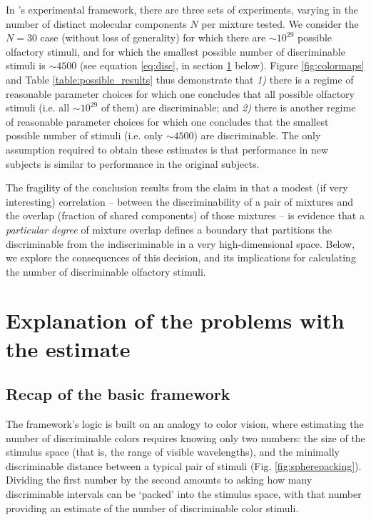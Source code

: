 \documentclass[letterpaper,twocolumn,10pt]{article}
\begin{document}
In \cite{bushdid_humans_2014}'s experimental framework, there are three sets of experiments, varying in the number of distinct molecular components $N$ per mixture tested.  
We consider the $N=30$ case (without loss of generality) for which there are $\sim 10^{29}$ possible olfactory stimuli, 
and for which the smallest possible number of discriminable stimuli is $\sim 4500$ (see equation \ref{eq:disc}, in section \ref{sec:explanation} below).  
Figure \ref{fig:colormaps} and Table \ref{table:possible_results} thus demonstrate that \textit{1)} there is a regime of reasonable parameter choices for which one concludes that all possible olfactory stimuli (i.e. all $\sim 10^{29}$ of them) are discriminable; 
and \textit{2)} there is another regime of reasonable parameter choices for which one concludes that the smallest possible number of stimuli (i.e. only $\sim 4500$) are discriminable.  
The only assumption required to obtain these estimates is that performance in new subjects is similar to performance in the original subjects.  

The fragility of the conclusion results from the claim in \cite{bushdid_humans_2014} that a modest (if very interesting) correlation -- between the discriminability of a pair of mixtures and the overlap (fraction of shared components) of those mixtures --
is evidence that a \emph{particular degree} of mixture overlap defines a boundary that partitions the discriminable from the indiscriminable in a very high-dimensional space.  
Below, we explore the consequences of this decision, and its implications for calculating the number of discriminable olfactory stimuli. 

\section{Explanation of the problems with the estimate}
\label{sec:explanation}

\subsection{Recap of the basic framework}
\label{sec:recap}

The framework's logic is built on an analogy to color vision, 
where estimating the number of discriminable colors requires knowing only two numbers: 
the size of the stimulus space (that is, the range of visible wavelengths), 
and the minimally discriminable distance between a typical pair of stimuli (Fig. \ref{fig:spherepacking}). 
Dividing the first number by the second amounts to asking how many discriminable intervals can be `packed' into the stimulus space, 
with that number providing an estimate of the number of discriminable color stimuli. 
\end{document}
